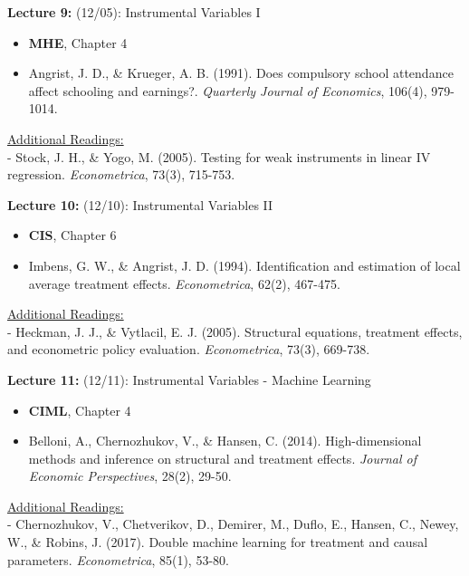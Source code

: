 \documentclass[12pt]{article}
\begin{document}
\vspace{2em}
\noindent\textbf{Lecture 9:} (12/05): Instrumental Variables I \\
\vspace{1em}
\begin{itemize}
    \item \textbf{MHE}, Chapter 4
    \item Angrist, J. D., \& Krueger, A. B. (1991). Does compulsory school attendance affect schooling and earnings?. \textit{Quarterly Journal of Economics}, 106(4), 979-1014.
\end{itemize}
\vspace{1em}
\underline{Additional Readings:} \\
\hspace{1em} - Stock, J. H., \& Yogo, M. (2005). Testing for weak instruments in linear IV regression. \textit{Econometrica}, 73(3), 715-753.

\vspace{2em}
\noindent\textbf{Lecture 10:} (12/10): Instrumental Variables II \\
\vspace{1em}
\begin{itemize}
    \item \textbf{CIS}, Chapter 6
    \item Imbens, G. W., \& Angrist, J. D. (1994). Identification and estimation of local average treatment effects. \textit{Econometrica}, 62(2), 467-475.
\end{itemize}
\vspace{1em}
\underline{Additional Readings:} \\
\hspace{1em} - Heckman, J. J., \& Vytlacil, E. J. (2005). Structural equations, treatment effects, and econometric policy evaluation. \textit{Econometrica}, 73(3), 669-738.

\vspace{2em}
\noindent\textbf{Lecture 11:} (12/11): Instrumental Variables - Machine Learning \\
\vspace{1em}
\begin{itemize}
    \item \textbf{CIML}, Chapter 4
    \item Belloni, A., Chernozhukov, V., \& Hansen, C. (2014). High-dimensional methods and inference on structural and treatment effects. \textit{Journal of Economic Perspectives}, 28(2), 29-50.
\end{itemize}
\vspace{1em}
\underline{Additional Readings:} \\
\hspace{1em} - Chernozhukov, V., Chetverikov, D., Demirer, M., Duflo, E., Hansen, C., Newey, W., \& Robins, J. (2017). Double machine learning for treatment and causal parameters. \textit{Econometrica}, 85(1), 53-80.
\end{document}
